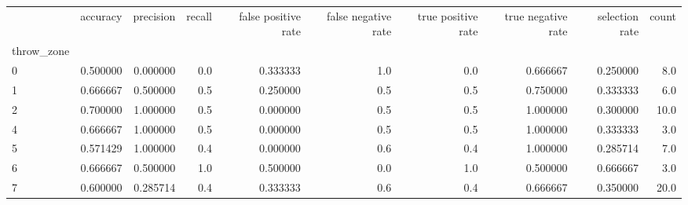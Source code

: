 \begin{tabular}{lrrrrrrrrr}
\toprule
{} &  accuracy &  precision &  recall &  false positive rate &  false negative rate &  true positive rate &  true negative rate &  selection rate &  count \\
throw\_zone &           &            &         &                      &                      &                     &                     &                 &        \\
\midrule
0          &  0.500000 &   0.000000 &     0.0 &             0.333333 &                  1.0 &                 0.0 &            0.666667 &        0.250000 &    8.0 \\
1          &  0.666667 &   0.500000 &     0.5 &             0.250000 &                  0.5 &                 0.5 &            0.750000 &        0.333333 &    6.0 \\
2          &  0.700000 &   1.000000 &     0.5 &             0.000000 &                  0.5 &                 0.5 &            1.000000 &        0.300000 &   10.0 \\
4          &  0.666667 &   1.000000 &     0.5 &             0.000000 &                  0.5 &                 0.5 &            1.000000 &        0.333333 &    3.0 \\
5          &  0.571429 &   1.000000 &     0.4 &             0.000000 &                  0.6 &                 0.4 &            1.000000 &        0.285714 &    7.0 \\
6          &  0.666667 &   0.500000 &     1.0 &             0.500000 &                  0.0 &                 1.0 &            0.500000 &        0.666667 &    3.0 \\
7          &  0.600000 &   0.285714 &     0.4 &             0.333333 &                  0.6 &                 0.4 &            0.666667 &        0.350000 &   20.0 \\
\bottomrule
\end{tabular}
